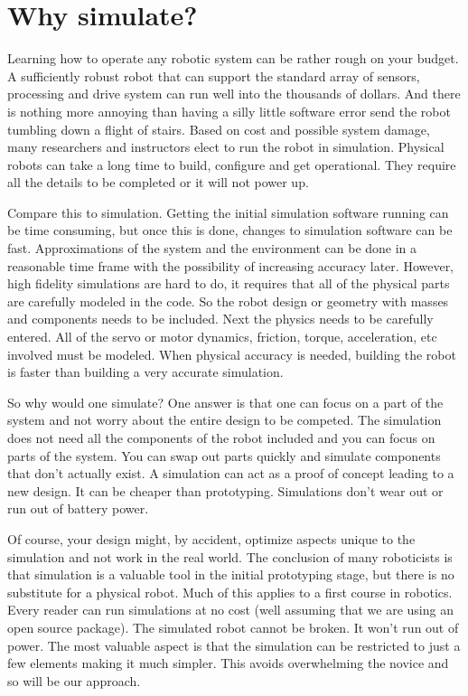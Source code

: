\hypertarget{why-simulate}{%
\section{Why simulate?}\label{why-simulate}}

Learning how to operate any robotic system can be rather rough on your
budget. A sufficiently robust robot that can support the standard array
of sensors, processing and drive system can run well into the thousands
of dollars. And there is nothing more annoying than having a silly
little software error send the robot tumbling down a flight of stairs.
Based on cost and possible system damage, many researchers and
instructors elect to run the robot in simulation. Physical robots can
take a long time to build, configure and get operational. They require
all the details to be completed or it will not power up.

Compare this to simulation. Getting the initial simulation software
running can be time consuming, but once this is done, changes to
simulation software can be fast. Approximations of the system and the
environment can be done in a reasonable time frame with the possibility
of increasing accuracy later. However, high fidelity simulations are
hard to do, it requires that all of the physical parts are carefully
modeled in the code. So the robot design or geometry with masses and
components needs to be included. Next the physics needs to be carefully
entered. All of the servo or motor dynamics, friction, torque,
acceleration, etc involved must be modeled. When physical accuracy is
needed, building the robot is faster than building a very accurate
simulation.

So why would one simulate? One answer is that one can focus on a part of
the system and not worry about the entire design to be competed. The
simulation does not need all the components of the robot included and
you can focus on parts of the system. You can swap out parts quickly and
simulate components that don't actually exist. A simulation can act as a
proof of concept leading to a new design. It can be cheaper than
prototyping. Simulations don't wear out or run out of battery power.

Of course, your design might, by accident, optimize aspects unique to
the simulation and not work in the real world. The conclusion of many
roboticists is that simulation is a valuable tool in the initial
prototyping stage, but there is no substitute for a physical robot. Much
of this applies to a first course in robotics. Every reader can run
simulations at no cost (well assuming that we are using an open source
package). The simulated robot cannot be broken. It won't run out of
power. The most valuable aspect is that the simulation can be restricted
to just a few elements making it much simpler. This avoids overwhelming
the novice and so will be our approach.

